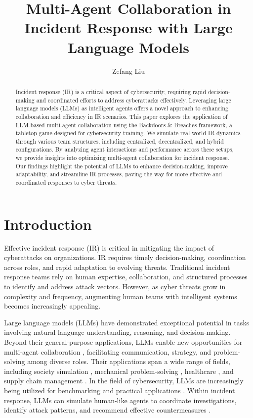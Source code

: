 \documentclass[letterpaper]{article} %
\title{Multi-Agent Collaboration in Incident Response with Large Language Models}
\author {
    Zefang Liu
}
\begin{document}
\thispagestyle{firstpagehf}
\maketitle
\begin{abstract}
Incident response (IR) is a critical aspect of cybersecurity, requiring rapid decision-making and coordinated efforts to address cyberattacks effectively. Leveraging large language models (LLMs) as intelligent agents offers a novel approach to enhancing collaboration and efficiency in IR scenarios. This paper explores the application of LLM-based multi-agent collaboration using the Backdoors \& Breaches framework, a tabletop game designed for cybersecurity training. We simulate real-world IR dynamics through various team structures, including centralized, decentralized, and hybrid configurations. By analyzing agent interactions and performance across these setups, we provide insights into optimizing multi-agent collaboration for incident response. Our findings highlight the potential of LLMs to enhance decision-making, improve adaptability, and streamline IR processes, paving the way for more effective and coordinated responses to cyber threats.
\end{abstract}
\section{Introduction}

Effective incident response (IR) \citep{kruse2001computer,luttgens2014incident} is critical in mitigating the impact of cyberattacks on organizations. IR requires timely decision-making, coordination across roles, and rapid adaptation to evolving threats. Traditional incident response teams rely on human expertise, collaboration, and structured processes to identify and address attack vectors. However, as cyber threats grow in complexity and frequency, augmenting human teams with intelligent systems becomes increasingly appealing.

Large language models (LLMs) \citep{naveed2023comprehensive} have demonstrated exceptional potential in tasks involving natural language understanding, reasoning, and decision-making. Beyond their general-purpose applications, LLMs enable new opportunities for multi-agent collaboration \citep{guo2024large}, facilitating communication, strategy, and problem-solving among diverse roles. Their applications span a wide range of fields, including society simulation \citep{park2023generative}, mechanical problem-solving \citep{ni2024mechagents}, healthcare \citep{wang2024colacare}, and supply chain management \citep{quan2024invagent}. In the field of cybersecurity, LLMs are increasingly being utilized for benchmarking \citep{liu2023secqa,liu2024cyberbench,tihanyi2024cybermetric} and practical applications \citep{motlagh2024large,xu2024large,zhang2024llms}. Within incident response, LLMs can simulate human-like agents to coordinate investigations, identify attack patterns, and recommend effective countermeasures \citep{hays2024employing}.
\end{document}
